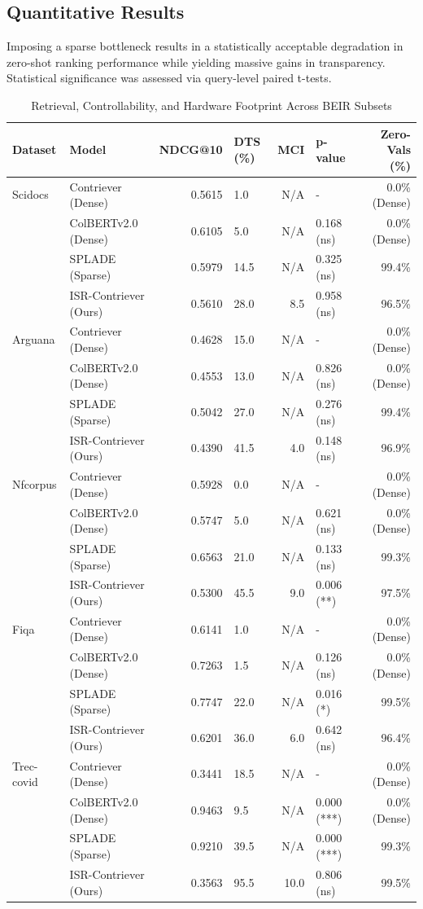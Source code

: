 \documentclass[sigconf,authordraft]{acmart}
\begin{document}
\subsection{Quantitative Results}
Imposing a sparse bottleneck results in a statistically acceptable degradation in zero-shot ranking performance while yielding massive gains in transparency. Statistical significance was assessed via query-level paired t-tests.

\begin{table}[htbp]
\centering
\caption{Retrieval, Controllability, and Hardware Footprint Across BEIR Subsets}
\label{tab:beir_results}
\begin{tabular}{llrlrlr}
\toprule
Dataset & Model & NDCG@10 & DTS (\%) & MCI & p-value & Zero-Vals (\%) \\
\midrule
Scidocs & Contriever (Dense) & 0.5615 & 1.0 & N/A & - & 0.0\% (Dense) \\
& ColBERTv2.0 (Dense) & 0.6105 & 5.0 & N/A & 0.168 (ns) & 0.0\% (Dense) \\
& SPLADE (Sparse) & 0.5979 & 14.5 & N/A & 0.325 (ns) & 99.4\% \\
& ISR-Contriever (Ours) & 0.5610 & 28.0 & 8.5 & 0.958 (ns) & 96.5\% \\
\midrule
Arguana & Contriever (Dense) & 0.4628 & 15.0 & N/A & - & 0.0\% (Dense) \\
& ColBERTv2.0 (Dense) & 0.4553 & 13.0 & N/A & 0.826 (ns) & 0.0\% (Dense) \\
& SPLADE (Sparse) & 0.5042 & 27.0 & N/A & 0.276 (ns) & 99.4\% \\
& ISR-Contriever (Ours) & 0.4390 & 41.5 & 4.0 & 0.148 (ns) & 96.9\% \\
\midrule
Nfcorpus & Contriever (Dense) & 0.5928 & 0.0 & N/A & - & 0.0\% (Dense) \\
& ColBERTv2.0 (Dense) & 0.5747 & 5.0 & N/A & 0.621 (ns) & 0.0\% (Dense) \\
& SPLADE (Sparse) & 0.6563 & 21.0 & N/A & 0.133 (ns) & 99.3\% \\
& ISR-Contriever (Ours) & 0.5300 & 45.5 & 9.0 & 0.006 (**) & 97.5\% \\
\midrule
Fiqa & Contriever (Dense) & 0.6141 & 1.0 & N/A & - & 0.0\% (Dense) \\
& ColBERTv2.0 (Dense) & 0.7263 & 1.5 & N/A & 0.126 (ns) & 0.0\% (Dense) \\
& SPLADE (Sparse) & 0.7747 & 22.0 & N/A & 0.016 (*) & 99.5\% \\
& ISR-Contriever (Ours) & 0.6201 & 36.0 & 6.0 & 0.642 (ns) & 96.4\% \\
\midrule
Trec-covid & Contriever (Dense) & 0.3441 & 18.5 & N/A & - & 0.0\% (Dense) \\
& ColBERTv2.0 (Dense) & 0.9463 & 9.5 & N/A & 0.000 (***) & 0.0\% (Dense) \\
& SPLADE (Sparse) & 0.9210 & 39.5 & N/A & 0.000 (***) & 99.3\% \\
& ISR-Contriever (Ours) & 0.3563 & 95.5 & 10.0 & 0.806 (ns) & 99.5\% \\
\bottomrule
\end{tabular}
\end{table}
\end{document}
